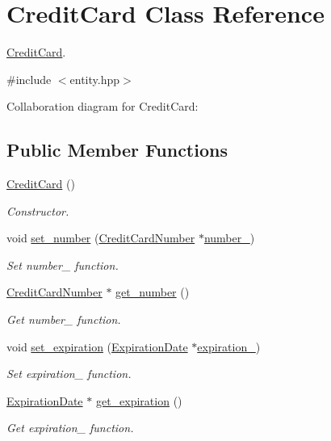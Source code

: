 \hypertarget{classCreditCard}{}\section{Credit\+Card Class Reference}
\label{classCreditCard}


\hyperlink{classCreditCard}{Credit\+Card}.  




{\ttfamily \#include $<$entity.\+hpp$>$}



Collaboration diagram for Credit\+Card\+:
\subsection*{Public Member Functions}
\begin{DoxyCompactItemize}
\item 
\hyperlink{classCreditCard_a955a3dd19bdecfe3f85d0c3f31a33a9d}{Credit\+Card} ()
\begin{DoxyCompactList}\small\item\em Constructor. \end{DoxyCompactList}\item 
void \hyperlink{classCreditCard_a1b1a48d62489bd5e95482d5e76c9e259}{set\+\_\+number} (\hyperlink{classCreditCardNumber}{Credit\+Card\+Number} $\ast$\hyperlink{classCreditCard_a0ee412bbea4b7b76fa7a927436b0b897}{number\+\_\+})
\begin{DoxyCompactList}\small\item\em Set number\+\_\+ function. \end{DoxyCompactList}\item 
\hyperlink{classCreditCardNumber}{Credit\+Card\+Number} $\ast$ \hyperlink{classCreditCard_a1e56dcf836cd5c06561f2b5e7e4619d8}{get\+\_\+number} ()
\begin{DoxyCompactList}\small\item\em Get number\+\_\+ function. \end{DoxyCompactList}\item 
void \hyperlink{classCreditCard_a5851a24c709c12d69c10b6c38873340d}{set\+\_\+expiration} (\hyperlink{classExpirationDate}{Expiration\+Date} $\ast$\hyperlink{classCreditCard_ab323dacb5d1d30417acbf61705a43332}{expiration\+\_\+})
\begin{DoxyCompactList}\small\item\em Set expiration\+\_\+ function. \end{DoxyCompactList}\item 
\hyperlink{classExpirationDate}{Expiration\+Date} $\ast$ \hyperlink{classCreditCard_a6210544b36be4e5aa4a849bac37e177d}{get\+\_\+expiration} ()
\begin{DoxyCompactList}\small\item\em Get expiration\+\_\+ function. \end{DoxyCompactList}\end{DoxyCompactItemize}
